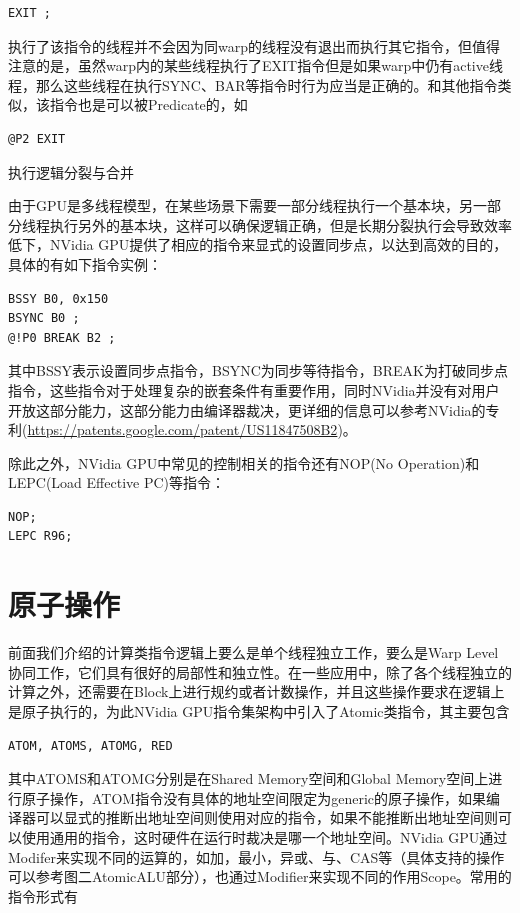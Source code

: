 \begin{lstlisting}
EXIT ;
\end{lstlisting}

执行了该指令的线程并不会因为同warp的线程没有退出而执行其它指令，但值得注意的是，虽然warp内的某些线程执行了EXIT指令但是如果warp中仍有active线程，那么这些线程在执行SYNC、BAR等指令时行为应当是正确的。和其他指令类似，该指令也是可以被Predicate的，如

\begin{lstlisting}
@P2 EXIT
\end{lstlisting}

执行逻辑分裂与合并

由于GPU是多线程模型，在某些场景下需要一部分线程执行一个基本块，另一部分线程执行另外的基本块，这样可以确保逻辑正确，但是长期分裂执行会导致效率低下，NVidia GPU提供了相应的指令来显式的设置同步点，以达到高效的目的，具体的有如下指令实例：

\begin{lstlisting}
BSSY B0, 0x150
BSYNC B0 ;
@!P0 BREAK B2 ;
\end{lstlisting}

其中BSSY表示设置同步点指令，BSYNC为同步等待指令，BREAK为打破同步点指令，这些指令对于处理复杂的嵌套条件有重要作用，同时NVidia并没有对用户开放这部分能力，这部分能力由编译器裁决，更详细的信息可以参考NVidia的专利(\url{https://patents.google.com/patent/US11847508B2})。

除此之外，NVidia GPU中常见的控制相关的指令还有NOP(No Operation)和LEPC(Load Effective PC)等指令：

\begin{lstlisting}
NOP;
LEPC R96;
\end{lstlisting}

\section{原子操作}

前面我们介绍的计算类指令逻辑上要么是单个线程独立工作，要么是Warp Level协同工作，它们具有很好的局部性和独立性。在一些应用中，除了各个线程独立的计算之外，还需要在Block上进行规约或者计数操作，并且这些操作要求在逻辑上是原子执行的，为此NVidia GPU指令集架构中引入了Atomic类指令，其主要包含

\begin{lstlisting}
ATOM, ATOMS, ATOMG, RED
\end{lstlisting}

其中ATOMS和ATOMG分别是在Shared Memory空间和Global Memory空间上进行原子操作，ATOM指令没有具体的地址空间限定为generic的原子操作，如果编译器可以显式的推断出地址空间则使用对应的指令，如果不能推断出地址空间则可以使用通用的指令，这时硬件在运行时裁决是哪一个地址空间。NVidia GPU通过Modifer来实现不同的运算的，如加，最小，异或、与、CAS等（具体支持的操作可以参考图二AtomicALU部分），也通过Modifier来实现不同的作用Scope。常用的指令形式有

